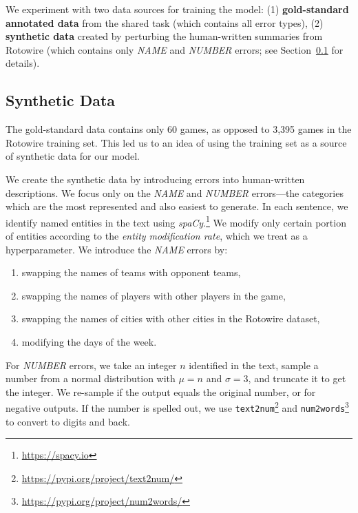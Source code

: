 We experiment with two data sources for training the model:
(1) \textbf{gold-standard annotated data} from the shared task (which contains all error types),
(2) \textbf{synthetic data} created by perturbing the human-written summaries from Rotowire (which contains only \textit{NAME} and \textit{NUMBER} errors; see Section~\ref{sec:synth-data} for details).

\subsection{Synthetic Data}
\label{sec:synth-data}
The gold-standard data contains only 60 games, as opposed to 3,395 games in the Rotowire training set. This led us to an idea of using the training set as a source of synthetic data for our model.

We create the synthetic data by introducing errors into human-written descriptions. We focus only on the \textit{NAME} and \textit{NUMBER} errors---the categories which are the most represented and also easiest to generate. In each sentence, we identify named entities in the text using \textit{spaCy}.\footnote{\url{https://spacy.io}} We modify only certain portion of entities according to the \textit{entity modification rate}, which we treat as a hyperparameter. We introduce the \textit{NAME} errors by:
\begin{enumerate}[label={(\arabic*)},nosep]
    \item swapping the names of teams with opponent teams,
    \item swapping the names of players with other players in the game,
    \item swapping the names of cities with other cities in the Rotowire dataset,
    \item modifying the days of the week.
\end{enumerate}
For \textit{NUMBER} errors, we take an integer $n$ identified in the text, sample a number from a normal distribution with $\mu=n$ and $\sigma=3$, and truncate it to get the integer. We re-sample if the output equals the original number, or for negative outputs.
If the number is spelled out, we use \texttt{text2num}\footnote{\url{https://pypi.org/project/text2num/}} and  \texttt{num2words}\footnote{\url{https://pypi.org/project/num2words/}} to convert to digits and back.


